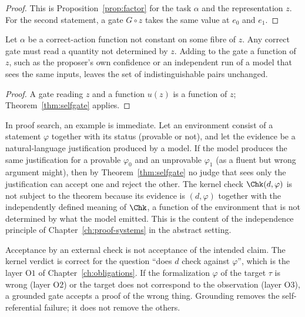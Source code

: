 \begin{proof}
This is Proposition~\ref{prop:factor} for the task $\alpha$ and the representation $z$. For the second statement, a gate $G\circ z$ takes the same value at $e_0$ and $e_1$.
\end{proof}

\begin{corollary}
\label{cor:outside}
Let $\alpha$ be a correct-action function not constant on some fibre of $z$. Any correct gate must read a quantity not determined by $z$. Adding to the gate a function of $z$, such as the proposer's own confidence or an independent run of a model that sees the same inputs, leaves the set of indistinguishable pairs unchanged.
\end{corollary}

\begin{proof}
A gate reading $z$ and a function $u(z)$ is a function of $z$; Theorem~\ref{thm:selfgate} applies.
\end{proof}

In proof search, an example is immediate. Let an environment consist of a statement $\varphi$ together with its status (provable or not), and let the evidence be a natural-language justification produced by a model. If the model produces the same justification for a provable $\varphi_0$ and an unprovable $\varphi_1$ (as a fluent but wrong argument might), then by Theorem~\ref{thm:selfgate} no judge that sees only the justification can accept one and reject the other. The kernel check $\Chk(d,\varphi)$ is not subject to the theorem because its evidence is $(d,\varphi)$ together with the independently defined meaning of $\Chk$, a function of the environment that is not determined by what the model emitted. This is the content of the independence principle of Chapter~\ref{ch:proof-systems} in the abstract setting.

\begin{remark}
\label{rem:grounded}
Acceptance by an external check is not acceptance of the intended claim. The kernel verdict is correct for the question ``does $d$ check against $\varphi$'', which is the layer $\mathrm{O1}$ of Chapter~\ref{ch:obligations}. If the formalization $\varphi$ of the target $\tau$ is wrong (layer $\mathrm{O2}$) or the target does not correspond to the observation (layer $\mathrm{O3}$), a grounded gate accepts a proof of the wrong thing. Grounding removes the self-referential failure; it does not remove the others.
\end{remark}

